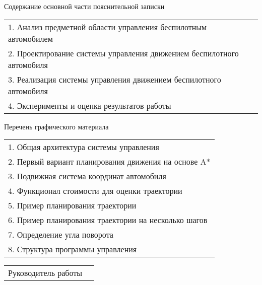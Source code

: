\noindent
Содержание основной части пояснительной записки \\
\renewcommand{\arraystretch}{1}
\begin{tabularx}{\linewidth}{X}
    1. Анализ предметной области управления беспилотным автомобилем \\
    2. Проектирование системы управления движением беспилотного автомобиля \\
    3. Реализация системы управления движением беспилотного автомобиля \\
    4. Эксперименты и оценка результатов работы \\
\end{tabularx}

\newpage

\thispagestyle{empty}

\begin{center}
    Перечень графического материала
\end{center}

\noindent
\begin{tabularx}{\linewidth}{X}
    1. Общая архитектура системы управления \\
    2. Первый вариант планирования движения на основе A* \\
    3. Подвижная система координат автомобиля \\
    4. Функционал стоимости для оценки траектории \\
    5. Пример планирования траектории \\
    6. Пример планирования траектории на несколько шагов \\
    7. Определение угла поворота \\
    8. Структура программы управления \\
\end{tabularx}

\bigskip

\noindent
\begin{tabularx}{\linewidth}{@{}lP@{}}
    Руководитель работы  & 
\end{tabularx}

\bigskip
\bigskip


